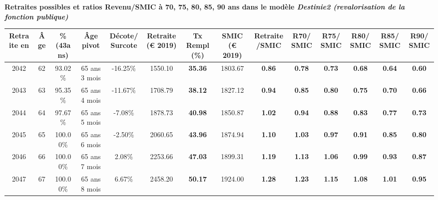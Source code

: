  \vspace{0.1cm} 
{\bf \noindent Retraites possibles et ratios Revenu/SMIC à 70, 75, 80, 85, 90 ans dans le modèle \emph{Destinie2 (revalorisation de la fonction publique)}}  
 
\begin{adjustbox}{max width=\textwidth} 
\begin{tabular}[htb]{|c|c||c|c|c||c|c||c|c||c|c|c|c|c|} 
\hline 
 Retraite en &  Âge &  \%(43ans) &  Âge pivot &  Décote/Surcote &  Retraite (\euro{} 2019) &  Tx Rempl(\%) &  SMIC (\euro{} 2019) &  Retraite/SMIC &  R70/SMIC &  R75/SMIC &  R80/SMIC &  R85/SMIC &  R90/SMIC \\ 
\hline \hline 
 2042 &  62 &  93.02\% &  65 ans 3 mois &  -16.25\% &  1550.10 &  {\bf 35.36} &  1803.67 &  {\bf {\color{red} 0.86}} &  {\bf {\color{red} 0.78}} &  {\bf {\color{red} 0.73}} &  {\bf {\color{red} 0.68}} &  {\bf {\color{red} 0.64}} &  {\bf {\color{red} 0.60}} \\ 
\hline 
 2043 &  63 &  95.35\% &  65 ans 4 mois &  -11.67\% &  1708.79 &  {\bf 38.12} &  1827.12 &  {\bf {\color{red} 0.94}} &  {\bf {\color{red} 0.85}} &  {\bf {\color{red} 0.80}} &  {\bf {\color{red} 0.75}} &  {\bf {\color{red} 0.70}} &  {\bf {\color{red} 0.66}} \\ 
\hline 
 2044 &  64 &  97.67\% &  65 ans 5 mois &  -7.08\% &  1878.73 &  {\bf 40.98} &  1850.87 &  {\bf 1.02} &  {\bf {\color{red} 0.94}} &  {\bf {\color{red} 0.88}} &  {\bf {\color{red} 0.83}} &  {\bf {\color{red} 0.77}} &  {\bf {\color{red} 0.73}} \\ 
\hline 
 2045 &  65 &  100.00\% &  65 ans 6 mois &  -2.50\% &  2060.65 &  {\bf 43.96} &  1874.94 &  {\bf 1.10} &  {\bf 1.03} &  {\bf {\color{red} 0.97}} &  {\bf {\color{red} 0.91}} &  {\bf {\color{red} 0.85}} &  {\bf {\color{red} 0.80}} \\ 
\hline 
 2046 &  66 &  100.00\% &  65 ans 7 mois &  2.08\% &  2253.66 &  {\bf 47.03} &  1899.31 &  {\bf 1.19} &  {\bf 1.13} &  {\bf 1.06} &  {\bf {\color{red} 0.99}} &  {\bf {\color{red} 0.93}} &  {\bf {\color{red} 0.87}} \\ 
\hline 
 2047 &  67 &  100.00\% &  65 ans 8 mois &  6.67\% &  2458.20 &  {\bf 50.17} &  1924.00 &  {\bf 1.28} &  {\bf 1.23} &  {\bf 1.15} &  {\bf 1.08} &  {\bf 1.01} &  {\bf {\color{red} 0.95}} \\ 
\hline 
\hline 
\end{tabular} 
\end{adjustbox} 
 
 \vspace{0.1cm} 

